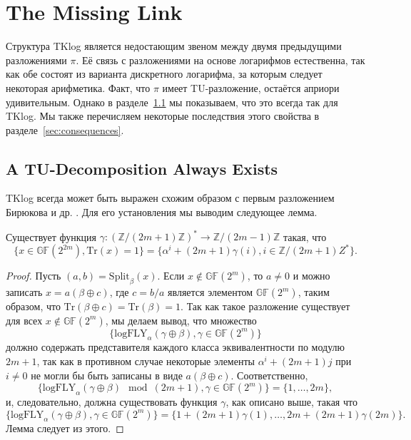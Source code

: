 \section{The Missing Link}
\label{sec:missing_link}
Структура TKlog является недостающим звеном между двумя предыдущими разложениями \(\pi\). Её связь с разложениями на основе логарифмов \cite{PU16} естественна, так как обе состоят из варианта дискретного логарифма, за которым следует некоторая арифметика. Факт, что \(\pi\) имеет TU-разложение, остаётся априори удивительным. Однако в разделе~\ref{sec:TU_decomposition_always_exists} мы показываем, что это всегда так для TKlog. Мы также перечисляем некоторые последствия этого свойства в разделе~\ref{sec:consequences}.

\subsection{A TU-Decomposition Always Exists}
\label{sec:TU_decomposition_always_exists}
TKlog всегда может быть выражен схожим образом с первым разложением Бирюкова и др. \cite{BPU16a}. Для его установления мы выводим следующее лемма.

\begin{lemma}
Существует функция \(\gamma : (\mathbb{Z}/(2m + 1)\mathbb{Z})^* \to \mathbb{Z}/(2m - 1)\mathbb{Z}\) такая, что 
\[
\{x \in \mathbb{GF}(2^{2m}), \mathrm{Tr}(x) = 1\} = \{\alpha^i + (2m+1)\gamma(i), i \in \mathbb{Z}/(2m + 1)Z^*\}.
\]
\end{lemma}

\begin{proof}
Пусть \((a, b) = \mathrm{Split}_{\beta}(x)\). Если \(x \notin \mathbb{GF}(2^m)\), то \(a \neq 0\) и можно записать \(x = a(\beta \oplus c)\), где \(c = b/a\) является элементом \(\mathbb{GF}(2^m)\), таким образом, что \(\mathrm{Tr}(\beta \oplus c) = \mathrm{Tr}(\beta) = 1\). Так как такое разложение существует для всех \(x \notin \mathbb{GF}(2^m)\), мы делаем вывод, что множество 
\[
\{\mathrm{logFLY}_{\alpha}(\gamma \oplus \beta), \gamma \in \mathbb{GF}(2^m)\}
\]
должно содержать представителя каждого класса эквивалентности по модулю \(2m + 1\), так как в противном случае некоторые элементы \(\alpha^i + (2m+1)j\) при \(i \neq 0\) не могли бы быть записаны в виде \(a(\beta \oplus c)\). Соответственно,
\[
\{\mathrm{logFLY}_{\alpha}(\gamma \oplus \beta) \mod (2m + 1), \gamma \in \mathbb{GF}(2^m)\} = \{1, \ldots, 2m\},
\]
и, следовательно, должна существовать функция \(\gamma\), как описано выше, такая что
\[
\{\mathrm{logFLY}_{\alpha}(\gamma \oplus \beta), \gamma \in \mathbb{GF}(2^m)\} = \{1 + (2m + 1)\gamma(1), \ldots, 2m + (2m + 1)\gamma(2m)\}.
\]
Лемма следует из этого.
\end{proof}

